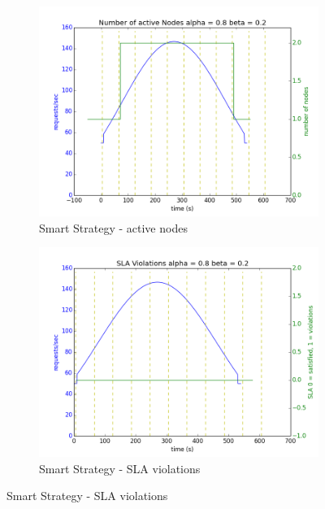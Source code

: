 \documentclass[12pt]{article}
\begin{document}
\begin{figure}[h!]
\begin{subfigure}{.5\textwidth}
\includegraphics[width=\textwidth]{Smart182nodes.png}
\caption{Smart Strategy - active nodes}
\end{subfigure}
\begin{subfigure}{.5\textwidth}
\includegraphics[width=\textwidth]{Smart182SLA.png}
\caption{Smart Strategy - SLA violations}
\end{subfigure}


\end{figure}
\end{document}
